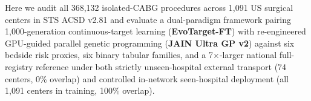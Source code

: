Here we audit all 368,132 isolated-CABG procedures across 1,091 US surgical centers in STS ACSD v2.81 and evaluate a dual-paradigm framework pairing 1,000-generation continuous-target learning (\textbf{EvoTarget-FT}) with re-engineered GPU-guided parallel genetic programming (\textbf{JAIN Ultra GP v2}) against six bedside risk proxies, six binary tabular families, and a 7$\times$-larger national full-registry reference under both strictly unseen-hospital external transport (74 centers, 0\% overlap) and controlled in-network seen-hospital deployment (all 1,091 centers in training, 100\% overlap).
